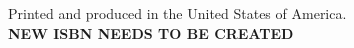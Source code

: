 \begin{minipage}[t][1.0cm][b]{\textwidth}
\begin{center}
Printed and produced in the United States of America.\\
\bf{NEW ISBN NEEDS TO BE CREATED}
\end{center}
\end{minipage}
